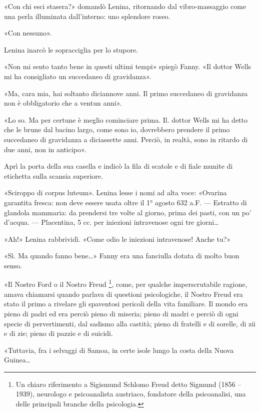 \documentclass[
a5paper, %
10pt, %
twoside, 
onecolumn, %
openany, %
]{memoir}
\renewenvironment{shaded}{%
  \def\FrameCommand{\fboxsep=\FrameSep \colorbox{shadecolor}}%
  \MakeFramed{\advance\hsize-\width \FrameRestore\FrameRestore}}%
 {\endMakeFramed}
\begin{document}
\begin{shaded}
    «Con chi esci stasera?» domandò Lenina, ritornando dal vibro-massaggio come una perla illuminata dall’interno: uno splendore roseo.

«Con nessuno».

Lenina inarcò le sopracciglia per lo stupore.

«Non mi sento tanto bene in questi ultimi tempi» spiegò Fanny. «Il dottor Wells mi ha consigliato un succedaneo di gravidanza».

«Ma, cara mia, hai soltanto diciannove anni. Il primo succedaneo di gravidanza non è obbligatorio che a ventun anni».

«Lo so. Ma per certune è meglio cominciare prima. Il. dottor Wells mi ha detto che le brune dal bacino largo, come sono io, dovrebbero prendere il primo succedaneo di gravidanza a diciassette anni. Perciò, in realtà, sono in ritardo di due anni, non in anticipo».

Aprì la porta della sua casella e indicò la fila di scatole e di fiale munite di etichetta sulla scansia superiore.

«Sciroppo di corpus luteum». Lenina lesse i nomi ad alta voce: «Ovarina garantita fresca: non deve essere usata oltre il 1° agosto 632 a.F. — Estratto di glandola mammaria: da prendersi tre volte al giorno, prima dei pasti, con un po’ d’acqua. — Placentina, 5 cc. per iniezioni intravenose ogni tre giorni…

«Ah!» Lenina rabbrividì. «Come odio le iniezioni intravenose! Anche tu?»

«Sì. Ma quando fanno bene…» Fanny era una fanciulla dotata di molto buon senso.
\end{shaded}

«Il Nostro Ford o il Nostro Freud \footnote{Un chiaro riferimento a Sigismund Schlomo Freud detto Sigmund (1856 – 1939), neurologo e psicoanalista austriaco, fondatore della psicoanalisi, una delle principali branche della psicologia.}, come, per qualche imperscrutabile ragione, amava chiamarsi quando parlava di questioni psicologiche, il Nostro Freud era stato il primo a rivelare gli spaventosi pericoli della vita familiare. Il mondo era pieno di padri ed era perciò pieno di miseria; pieno di madri e perciò di ogni specie di pervertimenti, dal sadismo alla castità; pieno di fratelli e di sorelle, di zii e di zie; pieno di pazzie e di suicidi.

«Tuttavia, fra i selvaggi di Samoa, in certe isole lungo la costa della Nuova Guinea…
\end{document}
